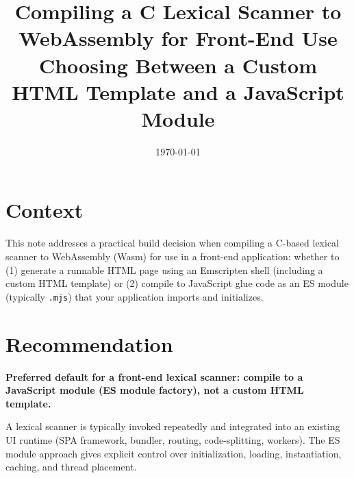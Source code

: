 \documentclass[11pt]{article}
\title{Compiling a C Lexical Scanner to WebAssembly for Front-End Use\\
\large Choosing Between a Custom HTML Template and a JavaScript Module}
\author{}
\date{\today}
\begin{document}
\maketitle

\section*{Context}
This note addresses a practical build decision when compiling a C-based lexical scanner to WebAssembly (Wasm) for use in a front-end application: whether to (1) generate a runnable HTML page using an Emscripten shell (including a custom HTML template) or (2) compile to JavaScript glue code as an ES module (typically \texttt{.mjs}) that your application imports and initializes.

\section*{Recommendation}
\textbf{Preferred default for a front-end lexical scanner: compile to a JavaScript module (ES module factory), not a custom HTML template.}

A lexical scanner is typically invoked repeatedly and integrated into an existing UI runtime (SPA framework, bundler, routing, code-splitting, workers). The ES module approach gives explicit control over initialization, loading, instantiation, caching, and thread placement.
\end{document}
